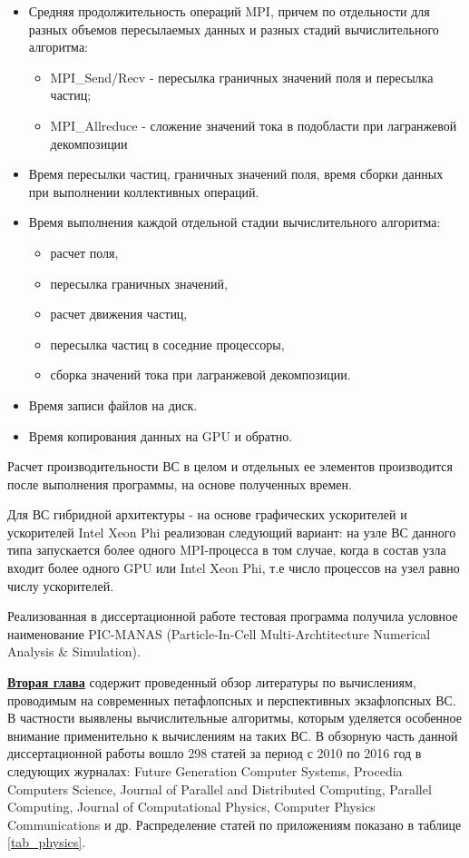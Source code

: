 \begin{itemize}
	\item Средняя продолжительность операций MPI, причем по отдельности для разных объемов пересылаемых данных и разных стадий вычислительного алгоритма:
	\begin{itemize}
		\item MPI\_Send/Recv - пересылка граничных значений поля и пересылка частиц;
		\item MPI\_Allreduce - сложение значений тока в подобласти при лагранжевой декомпозиции
		
	\end{itemize}	
	\item Время пересылки частиц, граничных значений поля, время сборки данных при выполнении коллективных операций.   
	\item Время выполнения каждой отдельной стадии вычислительного алгоритма:
	\begin{itemize}
		\item расчет поля, 
		\item пересылка граничных значений, 
		\item расчет движения частиц, 
		\item пересылка частиц в соседние процессоры, 
		\item сборка значений тока при лагранжевой декомпозиции.
	\end{itemize}
	\item Время записи файлов на диск.
	\item Время копирования данных на GPU и обратно.
	
\end{itemize}
Расчет производительности ВС в целом и отдельных ее элементов производится после выполнения программы, на основе полученных времен. 

Для ВС гибридной архитектуры - на основе графических ускорителей и ускорителей Intel Xeon Phi реализован следующий вариант: на узле ВС данного типа запускается более одного MPI-процесса в том случае, когда в состав узла входит более одного GPU или Intel Xeon Phi, т.е число процессов на узел равно числу ускорителей.

Реализованная в диссертационной работе тестовая программа получила условное наименование 
PIC-MANAS (Particle-In-Cell Multi-Archtitecture Numerical Analysis & Simulation).



\underline{\textbf{Вторая глава}} содержит проведенный обзор литературы по вычислениям, проводимым на современных петафлопсных и перспективных экзафлопсных ВС. В частности выявлены вычислительные алгоритмы, которым уделяется особенное внимание применительно к вычислениям на таких ВС.
В обзорную часть данной диссертационной работы вошло 298 статей за период с 2010 по 2016 год в следующих журналах: Future Generation Computer Systems, Procedia Computers Science, Journal of Parallel and Distributed Computing, Parallel Computing, Journal of Computational Physics, Computer Physics Communications и др.  Распределение статей по приложениям показано в таблице \ref{tab_physics}.

